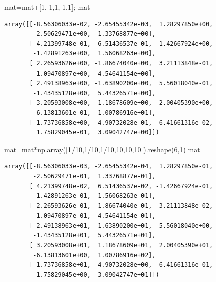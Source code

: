 \documentclass[
  letterpaper,
  DIV=11,
  numbers=noendperiod]{scrreprt}
\newenvironment{Shaded}{\begin{snugshade}}{\end{snugshade}}
\newcommand{\DecValTok}[1]{\textcolor[rgb]{0.68,0.00,0.00}{#1}}
\newcommand{\NormalTok}[1]{\textcolor[rgb]{0.00,0.23,0.31}{#1}}
\newcommand{\OperatorTok}[1]{\textcolor[rgb]{0.37,0.37,0.37}{#1}}
\begin{document}
\begin{Shaded}
\begin{Highlighting}[]
\NormalTok{mat}\OperatorTok{=}\NormalTok{mat}\OperatorTok{+}\NormalTok{[}\DecValTok{1}\NormalTok{,}\OperatorTok{{-}}\DecValTok{1}\NormalTok{,}\DecValTok{1}\NormalTok{,}\OperatorTok{{-}}\DecValTok{1}\NormalTok{,}\DecValTok{1}\NormalTok{]}\OperatorTok{;}\NormalTok{ mat}
\end{Highlighting}
\end{Shaded}

\begin{verbatim}
array([[-8.56306033e-02, -2.65455342e-03,  1.28297850e+00,
        -2.50629471e+00,  1.33768877e+00],
       [ 4.21399748e-01,  6.51436537e-01, -1.42667924e+00,
        -1.42891263e+00,  1.56068263e+00],
       [ 2.26593626e+00, -1.86674040e+00,  3.21113848e-01,
        -1.09470897e+00,  4.54641154e+00],
       [ 2.49138963e+00, -1.63890200e+00,  5.56018040e-01,
        -1.43435128e+00,  5.44326571e+00],
       [ 3.20593008e+00,  1.18678609e+00,  2.00405390e+00,
        -6.13813601e-01,  1.00786916e+01],
       [ 1.73736858e+00,  4.90732028e-01,  6.41661316e-02,
         1.75829045e-01,  3.09042747e+00]])
\end{verbatim}

\begin{Shaded}
\begin{Highlighting}[]
\NormalTok{mat}\OperatorTok{=}\NormalTok{mat}\OperatorTok{*}\NormalTok{np.array([}\DecValTok{1}\OperatorTok{/}\DecValTok{10}\NormalTok{,}\DecValTok{1}\OperatorTok{/}\DecValTok{10}\NormalTok{,}\DecValTok{1}\OperatorTok{/}\DecValTok{10}\NormalTok{,}\DecValTok{10}\NormalTok{,}\DecValTok{10}\NormalTok{,}\DecValTok{10}\NormalTok{]).reshape(}\DecValTok{6}\NormalTok{,}\DecValTok{1}\NormalTok{)}
\NormalTok{mat}
\end{Highlighting}
\end{Shaded}

\begin{verbatim}
array([[-8.56306033e-03, -2.65455342e-04,  1.28297850e-01,
        -2.50629471e-01,  1.33768877e-01],
       [ 4.21399748e-02,  6.51436537e-02, -1.42667924e-01,
        -1.42891263e-01,  1.56068263e-01],
       [ 2.26593626e-01, -1.86674040e-01,  3.21113848e-02,
        -1.09470897e-01,  4.54641154e-01],
       [ 2.49138963e+01, -1.63890200e+01,  5.56018040e+00,
        -1.43435128e+01,  5.44326571e+01],
       [ 3.20593008e+01,  1.18678609e+01,  2.00405390e+01,
        -6.13813601e+00,  1.00786916e+02],
       [ 1.73736858e+01,  4.90732028e+00,  6.41661316e-01,
         1.75829045e+00,  3.09042747e+01]])
\end{verbatim}
\end{document}
